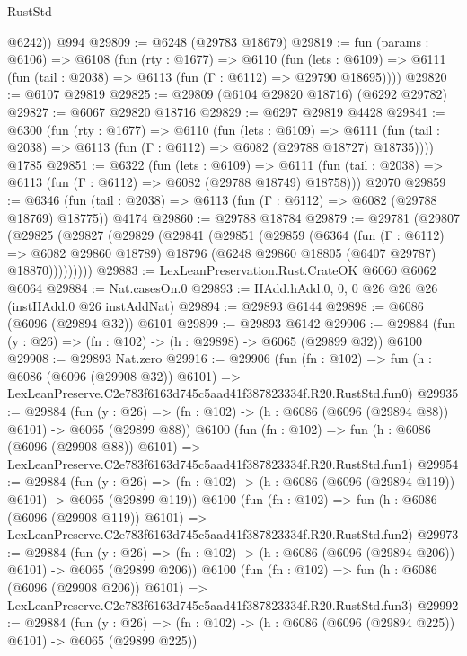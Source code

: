 \begin{lexlean}{RustStd}
\begin{coremodule}
        @6242))
    @994
@29809 := @6248 (@29783 @18679)
@29819 := fun (params : @6106) =>
  @6108
    (fun (rty : @1677) =>
    @6110
      (fun (lets : @6109) =>
      @6111 (fun (tail : @2038) => @6113 (fun (Γ : @6112) => @29790 @18695))))
@29820 := @6107 @29819
@29825 := @29809 (@6104 @29820 @18716) (@6292 @29782)
@29827 := @6067 @29820 @18716
@29829 := @6297 @29819 @4428
@29841 := @6300
    (fun (rty : @1677) =>
    @6110
      (fun (lets : @6109) =>
      @6111 (fun (tail : @2038) => @6113 (fun (Γ : @6112) => @6082 (@29788 @18727) @18735))))
    @1785
@29851 := @6322
    (fun (lets : @6109) =>
    @6111 (fun (tail : @2038) => @6113 (fun (Γ : @6112) => @6082 (@29788 @18749) @18758)))
    @2070
@29859 := @6346
    (fun (tail : @2038) => @6113 (fun (Γ : @6112) => @6082 (@29788 @18769) @18775))
    @4174
@29860 := @29788 @18784
@29879 := @29781
    (@29807
      (@29825
        (@29827
          (@29829
            (@29841
              (@29851
                (@29859
                  (@6364
                    (fun (Γ : @6112) => @6082 @29860 @18789)
                    @18796
                    (@6248 @29860 @18805 (@6407 @29787) @18870)))))))))
@29883 := LexLeanPreservation.Rust.CrateOK @6060 @6062 @6064
@29884 := Nat.casesOn.{0}
@29893 := HAdd.hAdd.{0, 0, 0} @26 @26 @26 (instHAdd.{0} @26 instAddNat)
@29894 := @29893 @6144
@29898 := @6086 (@6096 (@29894 @32)) @6101
@29899 := @29893 @6142
@29906 := @29884 (fun (y : @26) => (fn : @102) -> (h : @29898) -> @6065 (@29899 @32)) @6100
@29908 := @29893 Nat.zero
@29916 := @29906
    (fun (fn : @102) =>
    fun (h : @6086 (@6096 (@29908 @32)) @6101) =>
    LexLeanPreserve.C2e783f6163d745c5aad41f387823334f.R20.RustStd.fun0)
@29935 := @29884
    (fun (y : @26) => (fn : @102) -> (h : @6086 (@6096 (@29894 @88)) @6101) -> @6065 (@29899 @88))
    @6100
    (fun (fn : @102) =>
    fun (h : @6086 (@6096 (@29908 @88)) @6101) =>
    LexLeanPreserve.C2e783f6163d745c5aad41f387823334f.R20.RustStd.fun1)
@29954 := @29884
    (fun (y : @26) => (fn : @102) -> (h : @6086 (@6096 (@29894 @119)) @6101) -> @6065 (@29899 @119))
    @6100
    (fun (fn : @102) =>
    fun (h : @6086 (@6096 (@29908 @119)) @6101) =>
    LexLeanPreserve.C2e783f6163d745c5aad41f387823334f.R20.RustStd.fun2)
@29973 := @29884
    (fun (y : @26) => (fn : @102) -> (h : @6086 (@6096 (@29894 @206)) @6101) -> @6065 (@29899 @206))
    @6100
    (fun (fn : @102) =>
    fun (h : @6086 (@6096 (@29908 @206)) @6101) =>
    LexLeanPreserve.C2e783f6163d745c5aad41f387823334f.R20.RustStd.fun3)
@29992 := @29884
    (fun (y : @26) => (fn : @102) -> (h : @6086 (@6096 (@29894 @225)) @6101) -> @6065 (@29899 @225))

\end{coremodule}
\end{lexlean}
